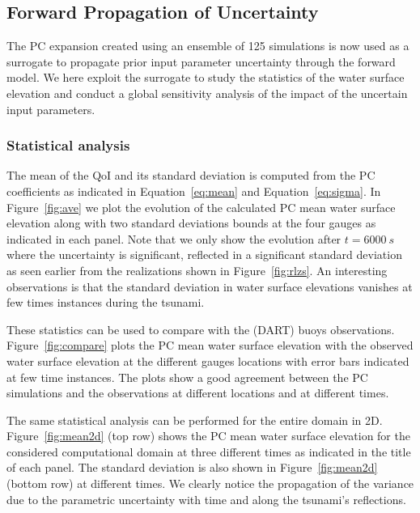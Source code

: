 \subsection{Forward Propagation of Uncertainty}
\label{sec:forward}
The PC expansion created using an ensemble of 125 \geoclaw simulations
is now used as a surrogate to propagate prior input parameter uncertainty 
through the forward model. We here exploit the surrogate 
to study the statistics of the water surface elevation and conduct 
a global sensitivity analysis of the impact of the uncertain input parameters.

\subsubsection{Statistical analysis}
The mean of the QoI and its standard deviation is computed
from the PC coefficients as indicated in Equation~\eqref{eq:mean} and Equation~\eqref{eq:sigma}. 
In Figure~\ref{fig:ave} we plot the evolution of
the calculated PC mean water surface elevation along with two standard deviations
bounds at the four gauges as indicated in each panel.  
Note that we only show the evolution after $t=6000~s$ where the uncertainty is significant,
reflected in a significant standard deviation as seen earlier from the realizations shown 
in Figure~\ref{fig:rlzs}. An interesting observations is that the
standard deviation in water surface elevations vanishes at few times instances
during the tsunami.

These statistics can be used to compare with the 
(DART) buoys observations. Figure~\ref{fig:compare} 
plots the PC mean water surface elevation with the observed 
water surface elevation at the different gauges locations
with error bars indicated at few time instances. 
The plots show a good agreement between the PC simulations and the 
observations at different locations and at different times. 

The same statistical analysis can be performed for the
entire domain in 2D. Figure~\ref{fig:mean2d} (top row) shows
the PC mean water surface elevation for the considered computational
domain at three different times as indicated in the title of each panel.
The standard deviation is also shown in Figure~\ref{fig:mean2d} (bottom row)
at different times. We clearly notice the propagation of the variance
due to the parametric uncertainty with time
and along the tsunami's reflections. 

        
